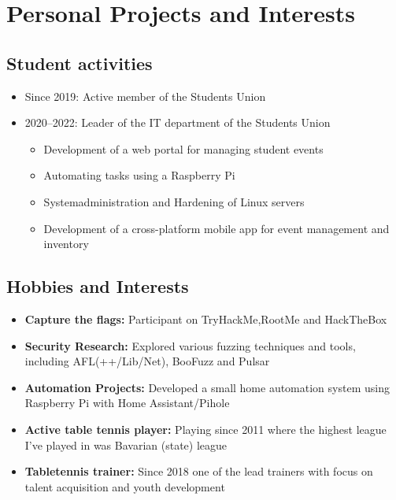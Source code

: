 \section{Personal Projects and Interests}\label{sec:eigenschaften}
\subsection{Student activities}\label{subsec:student-activities}
\begin{itemize}
    \item Since 2019: Active member of the Students Union
    \item 2020--2022: Leader of the IT department of the Students Union
    \begin{itemize}
        \item Development of a web portal for managing student events
        \item Automating tasks using a Raspberry Pi
        \item Systemadministration and Hardening of Linux servers
        \item Development of a cross-platform mobile app for event management and inventory
    \end{itemize}
\end{itemize}
\subsection{Hobbies and Interests}\label{subsec:hobbies-and-interests}
\begin{itemize}
    \item \textbf{Capture the flags:} Participant on TryHackMe,\newline RootMe and HackTheBox
    \item \textbf{Security Research:} Explored various fuzzing techniques and tools, including AFL(++/Lib/Net), BooFuzz and Pulsar
    \item \textbf{Automation Projects:} Developed a small home automation system using Raspberry Pi with Home Assistant/Pihole
    \item \textbf{Active table tennis player:} Playing since 2011 where the highest league I've played in was Bavarian (state) league
    \item \textbf{Tabletennis trainer:} Since 2018 one of the lead trainers with focus on talent acquisition and youth development
\end{itemize}
